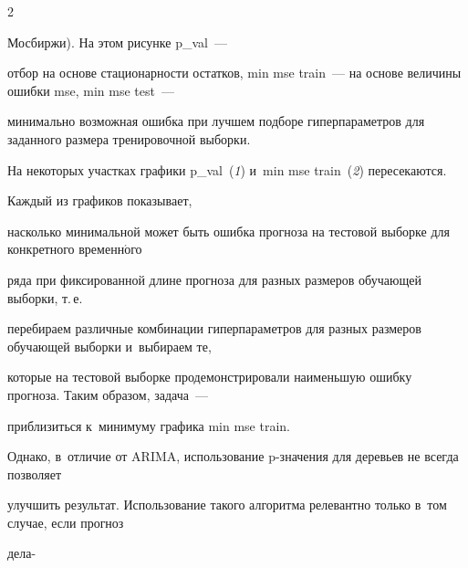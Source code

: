 \begin{multicols}{2}



\noindent

 Мосбиржи). На этом рисунке p\_val~--- 

отбор на основе стационарности остатков, min mse train~--- на основе величины ошибки mse, min mse test~--- 

минимально возможная ошибка при лучшем подборе гиперпараметров для заданного размера тренировочной выборки. 

На некоторых участках графики p\_val~(\textit{1}) и~min mse train~(\textit{2}) пересекаются. 



Каждый из графиков показывает, 

насколько минимальной может быть ошибка прогноза на тестовой выборке для конкретного временн$\acute{\mbox{о}}$го 

ряда при фиксированной длине прогноза для разных размеров обучающей выборки, т.\,е.\ 

перебираем различные комбинации гиперпараметров для разных размеров обуча\-ющей выборки и~выбираем те, 

которые на тестовой выборке продемонстрировали наименьшую ошибку прогноза. Таким образом, задача~--- 

приблизиться к~минимуму графика  min mse train.







Однако, в~отличие от ARIMA, использование \mbox{p-зна}\-че\-ния для деревьев не всегда позволяет 

улучшить результат. Использование такого алгоритма релевантно только в~том случае, если прогноз 

дела-\linebreak\vspace*{-12pt}



\pagebreak



\end{multicols}




